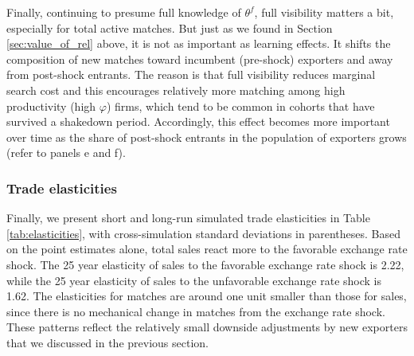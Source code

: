 \documentclass[12pt]{article}
\begin{document}
Finally, continuing to presume full knowledge of $\theta^{f}$, full visibility matters a bit, especially for total active matches. But just as we found in Section \ref{sec:value_of_rel} above, it is not as important as learning effects. It shifts the composition of new matches toward incumbent (pre-shock) exporters and away from post-shock entrants. The reason is that full visibility reduces marginal search cost and this encourages relatively more matching among high productivity (high  $\varphi$) firms, which tend to be common in cohorts that have survived a shakedown period. Accordingly, this effect becomes more important over time as the share of post-shock entrants in the population of exporters grows (refer to panels e and f).


\subsubsection{Trade elasticities}

Finally, we present short and long-run simulated trade elasticities in Table %
\ref{tab:elasticities}, with cross-simulation standard deviations in
parentheses. Based on the point estimates alone, total sales react more to
the favorable exchange rate shock. The 25 year elasticity of sales to the
favorable exchange rate shock is 2.22, while the 25 year elasticity of sales
to the unfavorable exchange rate shock is 1.62. The elasticities for matches
are around one unit smaller than those for sales, since there is no
mechanical change in matches from the exchange rate shock. These patterns reflect the relatively small downside adjustments by new exporters that we discussed in the previous section.
\end{document}
